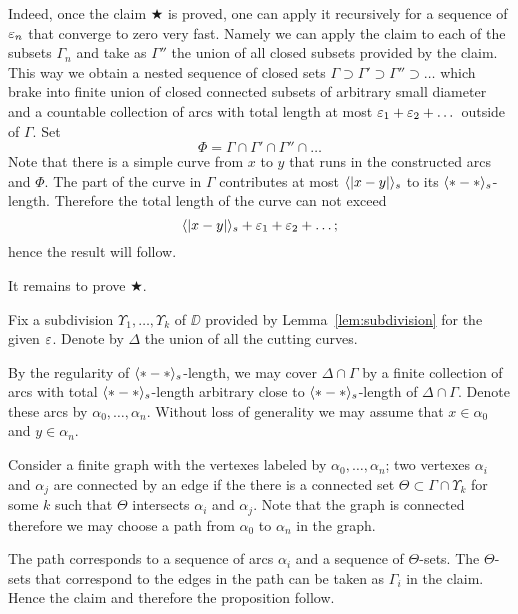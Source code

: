 Indeed, once the claim $\bigstar$ is proved, one can apply it recursively for a sequence of $\varepsilon_n$ that converge to zero very fast.
Namely we can apply the claim to each of the subsets $\Gamma_n$ and take as $\Gamma''$ the union of all closed subsets provided by the claim.
This way we obtain a nested sequence of closed sets $\Gamma\supset \Gamma'\supset\Gamma''\supset\dots$ which brake into finite union of closed connected subsets of arbitrary small diameter
and a countable collection of arcs with total length at most $\varepsilon_1+\varepsilon_2+\dots$ 
outside of $\Gamma$.
Set 
\[\Phi=\Gamma\cap \Gamma'\cap\Gamma''\cap\dots\]
Note that there is a simple curve from $x$ to $y$ that runs in the constructed arcs and $\Phi$.
The part of the curve in $\Gamma$ contributes at most $\langle|x-y|\rangle_s$ to its $\langle{*}-{*}\rangle_s$-length.
Therefore the total length of the curve can not exceed 
\[\langle|x-y|\rangle_s+\varepsilon_1+\varepsilon_2+\dots;\]
hence the result will follow.

It remains to prove $\bigstar$.

Fix a subdivision $\Upsilon_1,\dots,\Upsilon_k$ of $\DD$ provided by Lemma~\ref{lem:subdivision} for the given $\varepsilon$.
Denote by $\Delta$ the union of all the cutting curves.

By the regularity of $\langle{*}-{*}\rangle_s$-length, we may cover $\Delta\cap\Gamma$ by a finite collection of arcs with total  $\langle{*}-{*}\rangle_s$-length arbitrary close to $\langle{*}-{*}\rangle_s$-length of $\Delta\cap\Gamma$.
Denote these arcs by $\alpha_0,\dots,\alpha_n$.
Without loss of generality we may assume that $x\in\alpha_0$ and $y\in\alpha_n$.

Consider a finite graph with the vertexes labeled by $\alpha_0,\dots,\alpha_n$;
two vertexes $\alpha_i$ and $\alpha_j$ are connected by an edge if the there is a connected set $\Theta\subset \Gamma\cap\Upsilon_k$ for some $k$ such that $\Theta$ intersects $\alpha_i$ and $\alpha_j$.
Note that the graph is connected therefore we may choose a path from $\alpha_0$ to $\alpha_n$ in the graph.

The path corresponds to a sequence of arcs $\alpha_i$ and a sequence of $\Theta$-sets.
The $\Theta$-sets that correspond to the edges in the path can be taken as $\Gamma_i$ in the claim.
Hence the claim and therefore the proposition follow. 
\qeds



